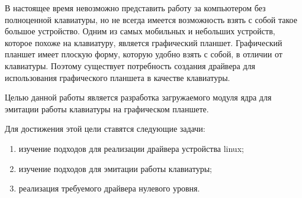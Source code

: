 \Introduction

В настоящее время невозможно представить работу за компьютером без полноценной клавиатуры, но не всегда имеется возможность взять с собой такое большое устройство. Одним из самых мобильных и небольших устройств, которое похоже на клавиатуру, является графический планшет. Графический планшет имеет плоскую форму, которую удобно взять с собой, в отличии от клавиатуры. Поэтому существует потребность создания драйвера для использования графического планшета в качестве клавиатуры.

Целью данной работы является разработка загружаемого модуля ядра для эмитации работы клавиатуры на графическом планшете.

Для достижения этой цели ставятся следующие задачи:

\begin{enumerate}
    \item изучение подходов для реализации драйвера устройства linux;
    \item изучение подходов для эмитации работы клавиатуры;
    \item реализация требуемого драйвера нулевого уровня.
\end{enumerate}
